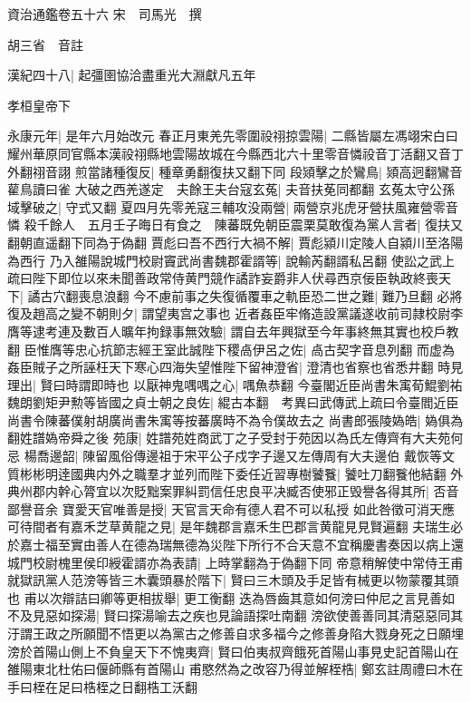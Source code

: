 資治通鑑卷五十六
宋　司馬光　撰

胡三省　音註

漢紀四十八|{
	起彊圉協洽盡重光大淵獻凡五年}


孝桓皇帝下

永康元年|{
	是年六月始改元}
春正月東羌先零圍祋祤掠雲陽|{
	二縣皆屬左馮翊宋白曰耀州華原同官縣本漢祋祤縣地雲陽故城在今縣西北六十里零音憐祋音丁活翻又音丁外翻祤音詡}
煎當諸種復反|{
	種章勇翻復扶又翻下同}
段熲擊之於鸞鳥|{
	熲高迥翻鸞音雚鳥讀曰雀}
大破之西羌遂定　夫餘王夫台寇玄菟|{
	夫音扶莬同都翻}
玄菟太守公孫域擊破之|{
	守式又翻}
夏四月先零羌寇三輔攻没兩營|{
	兩營京兆虎牙營扶風雍營零音憐}
殺千餘人　五月壬子晦日有食之　陳蕃既免朝臣震栗莫敢復為黨人言者|{
	復扶又翻朝直遥翻下同為于偽翻}
賈彪曰吾不西行大禍不解|{
	賈彪潁川定陵人自潁川至洛陽為西行}
乃入雒陽說城門校尉竇武尚書魏郡霍諝等|{
	說輸芮翻諝私呂翻}
使訟之武上疏曰陛下即位以來未聞善政常侍黄門競作譎詐妄爵非人伏尋西京佞臣執政終喪天下|{
	譎古穴翻喪息浪翻}
今不慮前事之失復循覆車之軌臣恐二世之難|{
	難乃旦翻}
必將復及趙高之變不朝則夕|{
	謂望夷宫之事也}
近者姦臣牢脩造設黨議遂收前司隷校尉李膺等逮考連及數百人曠年拘録事無效驗|{
	謂自去年興獄至今年事終無其實也校戶教翻}
臣惟膺等忠心抗節志經王室此誠陛下稷卨伊呂之佐|{
	卨古契字音息列翻}
而虚為姦臣賊子之所誣枉天下寒心四海失望惟陛下留神澄省|{
	澄清也省察也省悉井翻}
時見理出|{
	賢曰時謂即時也}
以厭神鬼喁喁之心|{
	喁魚恭翻}
今臺閣近臣尚書朱㝢荀鯤劉祐魏朗劉矩尹勲等皆國之貞士朝之良佐|{
	緄古本翻　考異曰武傳武上疏曰令臺閻近臣尚書令陳蕃僕射胡廣尚書朱㝢等按蕃廣時不為令僕故去之}
尚書郎張陵媯皓|{
	媯俱為翻姓譜媯帝舜之後}
苑康|{
	姓譜苑姓商武丁之子受封于苑因以為氏左傳齊有大夫苑何忌}
楊喬邊韶|{
	陳留風俗傳邊祖于宋平公子戍字子邊又左傳周有大夫邊伯}
戴恢等文質彬彬明逹國典内外之職羣才並列而陛下委任近習專樹饕餮|{
	饕吐刀翻餮他結翻}
外典州郡内幹心膂宜以次貶黜案罪糾罰信任忠良平决臧否使邪正毁譽各得其所|{
	否音鄙譽音余}
寶愛天官唯善是授|{
	天官言天命有德人君不可以私授}
如此咎徵可消天應可待間者有嘉禾芝草黄龍之見|{
	是年魏郡言嘉禾生巴郡言黄龍見見賢遍翻}
夫瑞生必於嘉士福至實由善人在德為瑞無德為災陛下所行不合天意不宜稱慶書奏因以病上還城門校尉槐里侯印綬霍諝亦為表請|{
	上時掌翻為于偽翻下同}
帝意稍解使中常侍王甫就獄訊黨人范滂等皆三木囊頭暴於階下|{
	賢曰三木頭及手足皆有械更以物蒙覆其頭也}
甫以次辯詰曰卿等更相拔舉|{
	更工衡翻}
迭為唇齒其意如何滂曰仲尼之言見善如不及見惡如探湯|{
	賢曰探湯喻去之疾也見論語探吐南翻}
滂欲使善善同其清惡惡同其汙謂王政之所願聞不悟更以為黨古之修善自求多福今之修善身陷大戮身死之日願埋滂於首陽山側上不負皇天下不愧夷齊|{
	賢曰伯夷叔齊餓死首陽山事見史記首陽山在雒陽東北杜佑曰偃師縣有首陽山}
甫愍然為之改容乃得並解桎梏|{
	鄭玄註周禮曰木在手曰桎在足曰梏桎之日翻梏工沃翻}
